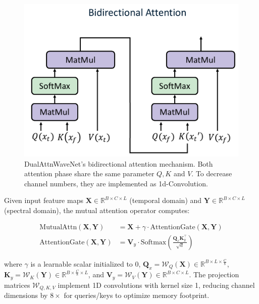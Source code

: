 \documentclass[conference]{IEEEtran}
\begin{document}
\begin{figure}[tb]
    \centering
    \includegraphics[width=0.9\linewidth]{bidirectional-attention.pdf}
    \caption{DualAttnWaveNet's bidirectional attention mechanism. Both attention phase share the same parameter $Q, K$ and $V$. To decrease channel numbers, they are implemented as 1d-Convolution.}
    \label{fig:bidirectional-attention}
\end{figure}

Given input feature maps $\mathbf{X} \in \mathbb{R}^{B \times C \times L}$ (temporal domain) and $\mathbf{Y} \in \mathbb{R}^{B \times C \times L}$ (spectral domain), the mutual attention operator computes:

\begin{equation}
    \begin{aligned}
        \text{MutualAttn}(\mathbf{X}, \mathbf{Y})    & = \mathbf{X} + \gamma \cdot \text{AttentionGate}(\mathbf{X}, \mathbf{Y})                        \\
        \text{AttentionGate}(\mathbf{X}, \mathbf{Y}) & = \mathbf{V}_y \cdot \text{Softmax}\left(\frac{\mathbf{Q}_x \mathbf{K}_y^\top}{\sqrt{d}}\right)
    \end{aligned}
\end{equation}

where $\gamma$ is a learnable scalar initialized to 0, $\mathbf{Q}_x = \mathcal{W}_Q(\mathbf{X}) \in \mathbb{R}^{B \times L \times \frac{C}{8}}$, $\mathbf{K}_y = \mathcal{W}_K(\mathbf{Y}) \in \mathbb{R}^{B \times \frac{C}{8} \times L}$, and $\mathbf{V}_y = \mathcal{W}_V(\mathbf{Y}) \in \mathbb{R}^{B \times C \times L}$. The projection matrices $\mathcal{W}_{Q,K,V}$ implement 1D convolutions with kernel size 1, reducing channel dimensions by $8\times$ for queries/keys to optimize memory footprint.
\end{document}
